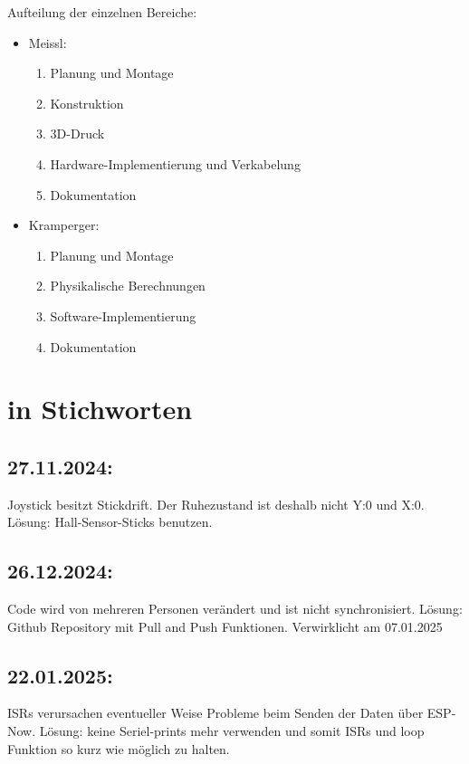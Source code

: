 \documentclass[a4paper,12pt]{article}
\begin{document}
Aufteilung der einzelnen Bereiche:
\begin{itemize}
    \item Meissl: 
    \begin{enumerate}
        \item Planung und Montage
        \item Konstruktion
        \item 3D-Druck
        \item Hardware-Implementierung und Verkabelung
        \item Dokumentation
    \end{enumerate}
    \item Kramperger:
    \begin{enumerate}
        \item Planung und Montage
        \item Physikalische Berechnungen
        \item Software-Implementierung
        \item Dokumentation
    \end{enumerate}
\end{itemize}




\newpage
\section{ in Stichworten}


\subsection{27.11.2024:} Joystick besitzt Stickdrift. Der Ruhezustand ist deshalb nicht Y:0 und X:0. Lösung: Hall-Sensor-Sticks benutzen.

\subsection{26.12.2024:} Code wird von mehreren Personen verändert und ist nicht synchronisiert. Lösung: Github Repository mit Pull and Push Funktionen. \newline
Verwirklicht am 07.01.2025

\subsection{22.01.2025:} ISRs verursachen eventueller Weise Probleme beim Senden der Daten über ESP-Now. Lösung: keine Seriel-prints mehr verwenden und somit ISRs und loop Funktion so kurz wie möglich zu halten.
\end{document}

